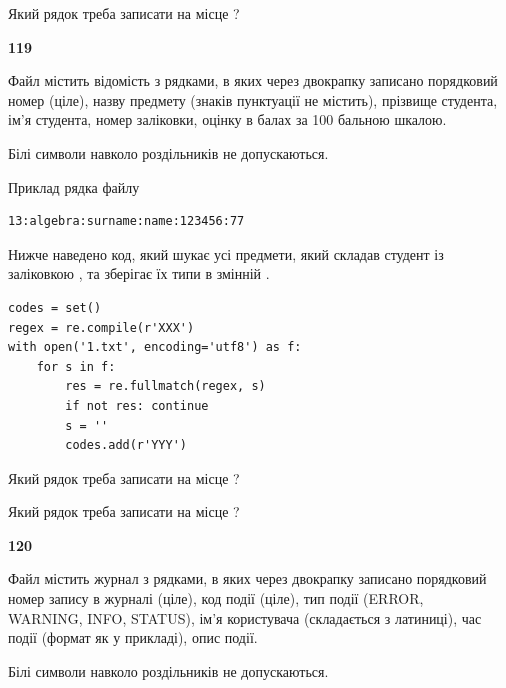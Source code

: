 Який рядок треба записати на місце  ?\par


\newpage

{\begin {center}\textbf{ 119}\end {center}}\par
Файл  містить відомість з рядками, в яких через двокрапку записано поряд\-ковий номер (ціле), назву предмету (знаків пунктуації не містить), прізвище студента, ім'я студента, номер заліковки, оцінку в балах за 100 бальною шкалою.

Білі символи навколо роздільників не допускаються.

Приклад рядка файлу



\begin{verbatim}
13:algebra:surname:name:123456:77
\end{verbatim}


Нижче наведено код, який шукає усі предмети, який складав студент із заліковкою , та зберігає їх типи в змінній .



\begin{verbatim}
codes = set()
regex = re.compile(r'XXX')
with open('1.txt', encoding='utf8') as f:
    for s in f:
        res = re.fullmatch(regex, s)
        if not res: continue
        s = ''
        codes.add(r'YYY')
\end{verbatim}





Який рядок треба записати на місце  ?\par
\vspace{5mm}


Який рядок треба записати на місце  ?\par


\newpage

{\begin {center}\textbf{ 120}\end {center}}\par
Файл  містить журнал з рядками, в яких через двокрапку записано поряд\-ко\-вий номер запису в журналі (ціле), код події (ціле), тип події (ERROR, \\WARNING, INFO, STATUS), ім'я користувача (складається з латиниці), час події (фор\-мат як у прикладі), опис події.

Білі символи навколо роздільників не допускаються.

